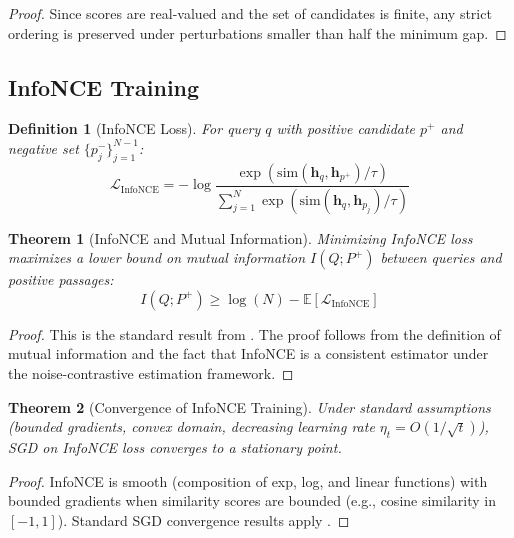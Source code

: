 \documentclass[10pt,twocolumn]{article}
\newtheorem{theorem}{Theorem}
\newtheorem{definition}{Definition}
\begin{document}
\begin{proof}
Since scores are real-valued and the set of candidates is finite, any strict ordering is preserved under perturbations smaller than half the minimum gap.
\end{proof}

\subsection{InfoNCE Training}

\begin{definition}[InfoNCE Loss]
For query $q$ with positive candidate $p^+$ and negative set $\{p_j^-\}_{j=1}^{N-1}$:
\begin{equation}
\mathcal{L}_{\text{InfoNCE}} = -\log \frac{\exp(\text{sim}(\mathbf{h}_q, \mathbf{h}_{p^+}) / \tau)}{\sum_{j=1}^{N} \exp(\text{sim}(\mathbf{h}_q, \mathbf{h}_{p_j}) / \tau)}
\label{eq:infonce}
\end{equation}
\end{definition}

\begin{theorem}[InfoNCE and Mutual Information]
\label{thm:infonce}
Minimizing InfoNCE loss maximizes a lower bound on mutual information $I(Q; P^+)$ between queries and positive passages:
\begin{equation}
I(Q; P^+) \geq \log(N) - \mathbb{E}[\mathcal{L}_{\text{InfoNCE}}]
\end{equation}
\end{theorem}

\begin{proof}
This is the standard result from \cite{oord2018infonce}. The proof follows from the definition of mutual information and the fact that InfoNCE is a consistent estimator under the noise-contrastive estimation framework.
\end{proof}

\begin{theorem}[Convergence of InfoNCE Training]
\label{thm:convergence}
Under standard assumptions (bounded gradients, convex domain, decreasing learning rate $\eta_t = O(1/\sqrt{t})$), SGD on InfoNCE loss converges to a stationary point.
\end{theorem}

\begin{proof}
InfoNCE is smooth (composition of exp, log, and linear functions) with bounded gradients when similarity scores are bounded (e.g., cosine similarity in $[-1, 1]$). Standard SGD convergence results apply \cite{bottou2018sgd}.
\end{proof}
\end{document}
